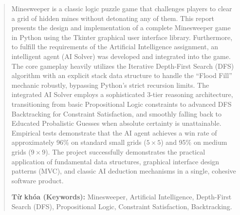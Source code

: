 \begin{abstract}
Minesweeper is a classic logic puzzle game that challenges players to clear a grid of hidden mines without detonating any of them. This report presents the design and implementation of a complete Minesweeper game in Python using the Tkinter graphical user interface library. Furthermore, to fulfill the requirements of the Artificial Intelligence assignment, an intelligent agent (AI Solver) was developed and integrated into the game. The core gameplay heavily utilizes the Iterative Depth-First Search (DFS) algorithm with an explicit stack data structure to handle the ``Flood Fill'' mechanic robustly, bypassing Python's strict recursion limits. The integrated AI Solver employs a sophisticated 3-tier reasoning architecture, transitioning from basic Propositional Logic constraints to advanced DFS Backtracking for Constraint Satisfaction, and smoothly falling back to Educated Probalistic Guesses when absolute certainty is unattainable. Empirical tests demonstrate that the AI agent achieves a win rate of approximately 96\% on standard small grids ($5\times5$) and 95\% on medium grids ($9\times9$). The project successfully demonstrates the practical application of fundamental data structures, graphical interface design patterns (MVC), and classic AI deduction mechanisms in a single, cohesive software product.

\textbf{Từ khóa (Keywords):} Minesweeper, Artificial Intelligence, Depth-First Search (DFS), Propositional Logic, Constraint Satisfaction, Backtracking.
\end{abstract}
